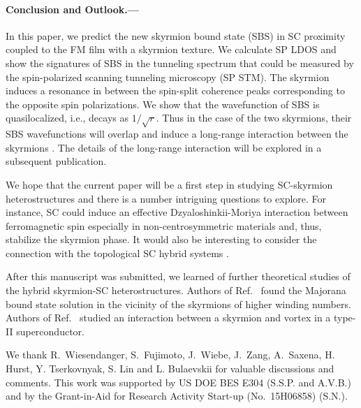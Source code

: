 \documentclass[twocolumn,showpacs,floatfix,longbibliography]{revtex4-1}
\begin{document}




\paragraph*{Conclusion and Outlook.---} \label{sec:conclusion}

In this paper, we predict the new skyrmion bound state (SBS) in SC proximity coupled to the FM film with a skyrmion texture. We calculate SP LDOS and show the signatures of SBS in the tunneling spectrum that could be measured by the spin-polarized scanning tunneling microscopy (SP STM). The skyrmion induces a resonance in between the spin-split coherence peaks corresponding to the opposite spin polarizations. We show that the wavefunction of SBS is quasilocalized, i.e., decays as $1/\sqrt{r}$. Thus in the case of the two skyrmions, their SBS wavefunctions will overlap and induce a long-range interaction between the skyrmions \cite{Yao2014,Menard2015}. The details of the long-range interaction will be explored in a subsequent publication.

We hope that the current paper will be a first step in studying SC-skyrmion heterostructures and there is a number intriguing questions to explore. For instance, SC could induce an effective Dzyaloshinkii-Moriya interaction between ferromagnetic spin especially in non-centrosymmetric materials and, thus, stabilize the skyrmion phase. It would also be interesting to consider the connection with the topological SC hybrid systems \cite{Alicea2012,Nakosai2013}. 

After this manuscript was submitted, we learned of further theoretical studies \cite{Yang2016,Hals2016} of the hybrid skyrmion-SC heterostructures. Authors of Ref.~\cite{Yang2016} found the Majorana bound state solution in the vicinity of the skyrmions of higher winding numbers. Authors of Ref.~\cite{Hals2016} studied an interaction between a skyrmion and vortex in a type-II superconductor. 

We thank  R.~Wiesendanger, S.~Fujimoto, J.~Wiebe, J.~Zang, A.~Saxena, H. Hurst, Y. Tserkovnyak, S. Lin and L. Bulaevskii for valuable discussions and comments. This work was supported by US DOE BES E304 (S.S.P. and A.V.B.) and by the Grant-in-Aid for Research Activity Start-up (No.~15H06858) (S.N.).
\end{document}
